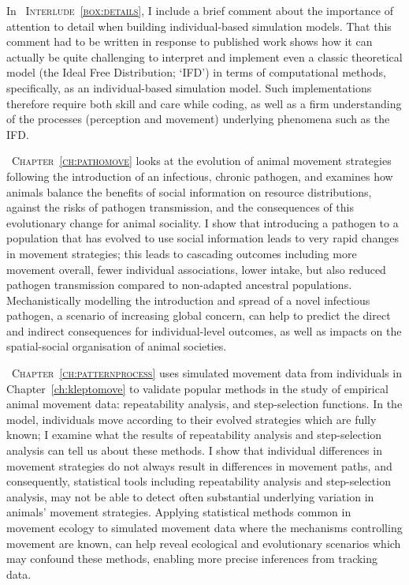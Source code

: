 \medskip

\noindent In {\scshape~Interlude~\ref{box:details}}, I include a brief comment about the importance of attention to detail when building individual-based simulation models.
That this comment had to be written in response to published work shows how it can actually be quite challenging to interpret and implement even a classic theoretical model (the Ideal Free Distribution; `IFD') in terms of computational methods, specifically, as an individual-based simulation model.
Such implementations therefore require both skill and care while coding, as well as a firm understanding of the processes (perception and movement) underlying phenomena such as the IFD.

\medskip

{\scshape~Chapter~\ref{ch:pathomove}} looks at the evolution of animal movement strategies following the introduction of an infectious, chronic pathogen, and examines how animals balance the benefits of social information on resource distributions, against the risks of pathogen transmission, and the consequences of this evolutionary change for animal sociality.
I show that introducing a pathogen to a population that has evolved to use social information leads to very rapid changes in movement strategies; this leads to cascading outcomes including more movement overall, fewer individual associations, lower intake, but also reduced pathogen transmission compared to non-adapted ancestral populations.
Mechanistically modelling the introduction and spread of a novel infectious pathogen, a scenario of increasing global concern, can help to predict the direct and indirect consequences for individual-level outcomes, as well as impacts on the spatial-social organisation of animal societies.

\medskip

{\scshape~Chapter~\ref{ch:patternprocess}} uses simulated movement data from individuals in Chapter~\ref{ch:kleptomove} to validate popular methods in the study of empirical animal movement data: repeatability analysis, and step-selection functions.
In the model, individuals move according to their evolved strategies which are fully known; I examine what the results of repeatability analysis and step-selection analysis can tell us about these methods.
I show that individual differences in movement strategies do not always result in differences in movement paths, and consequently, statistical tools including repeatability analysis and step-selection analysis, may not be able to detect often substantial underlying variation in animals' movement strategies.
Applying statistical methods common in movement ecology to simulated movement data where the mechanisms controlling movement are known, can help reveal ecological and evolutionary scenarios which may confound these methods, enabling more precise inferences from tracking data.

